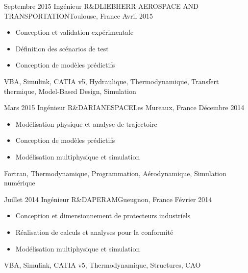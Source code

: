 \begin{experiences}
  \experience
    {Septembre 2015}   {Ingénieur R\&D}{LIEBHERR AEROSPACE AND TRANSPORTATION}{Toulouse, France}
    {Avril 2015} {
      \begin{itemize}
        \item Conception et validation expérimentale
        \item Définition des scénarios de test
        \item Conception de modèles prédictifs
      \end{itemize}
    }
    {VBA, Simulink, CATIA v5, Hydraulique, Thermodynamique, Transfert thermique, Model-Based Design, Simulation}
  \emptySeparator

  \experience
    {Mars 2015}   {Ingénieur R\&D}{ARIANESPACE}{Les Mureaux, France}
    {Décembre 2014} {
      \begin{itemize}
        \item Modélisation physique et analyse de trajectoire
        \item Conception de modèles prédictifs
        \item Modélisation multiphysique et simulation
      \end{itemize}
    }
    {Fortran, Thermodynamique, Programmation, Aérodynamique, Simulation numérique}
  \emptySeparator

  \experience
    {Juillet 2014}   {Ingénieur R\&D}{APERAM}{Gueugnon, France}
    {Février 2014} {
      \begin{itemize}
        \item Conception et dimensionnement de protecteurs industriels
        \item Réalisation de calculs et analyses pour la conformité
        \item Modélisation multiphysique et simulation
      \end{itemize}
    }
    {VBA, Simulink, CATIA v5, Thermodynamique, Structures, CAO}
  \emptySeparator
\end{experiences}
